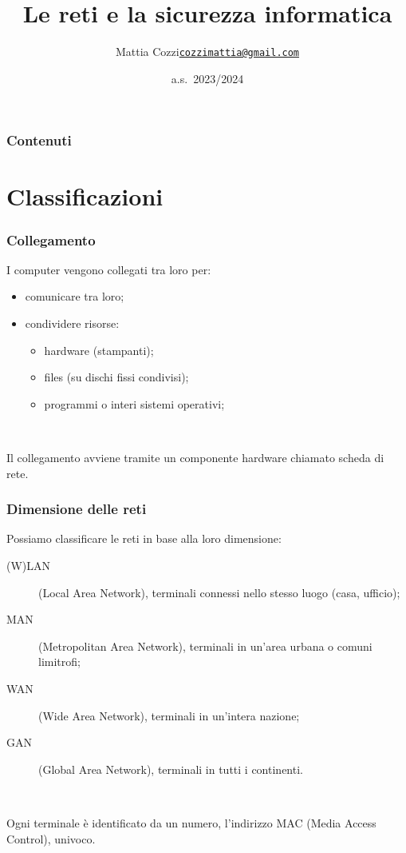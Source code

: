 \documentclass[handout]{beamer}
\title{Le reti e la sicurezza informatica}
\author{Mattia Cozzi\newline\href{mailto:cozzimattia@gmail.com}{\texttt{cozzimattia@gmail.com}}}
\date{a.s.~2023/2024}
\begin{document}
\begin{frame}
  \titlepage
\end{frame}


\begin{frame}
\frametitle{Contenuti}
\tableofcontents
\end{frame}



\section{Classificazioni}


\begin{frame}
\frametitle{Collegamento}
I computer vengono collegati tra loro per:
\begin{itemize}
  \item comunicare tra loro;\pause
  \item condividere risorse:\pause
  \begin{itemize}
    \item hardware (stampanti);\pause
    \item files (su dischi fissi condivisi);\pause
    \item programmi o interi sistemi operativi;\pause
  \end{itemize}
\end{itemize}

~

Il collegamento avviene tramite un componente hardware chiamato \alert{scheda di rete}.
\end{frame}


\begin{frame}
\frametitle{Dimensione delle reti}
Possiamo classificare le reti in base alla loro \alert<1>{dimensione}:\pause
\begin{description}
  \item[(W)LAN] (Local Area Network), terminali connessi nello stesso luogo (casa, ufficio);\pause
  \item[MAN] (Metropolitan Area Network), terminali in un'area urbana o comuni limitrofi;\pause
  \item[WAN] (Wide Area Network), terminali in un'intera nazione;\pause
  \item[GAN] (Global Area Network), terminali in tutti i continenti.
\end{description}\pause

~

Ogni terminale è identificato da un numero, l'indirizzo MAC (Media Access Control), univoco.
\end{frame}
\end{document}
